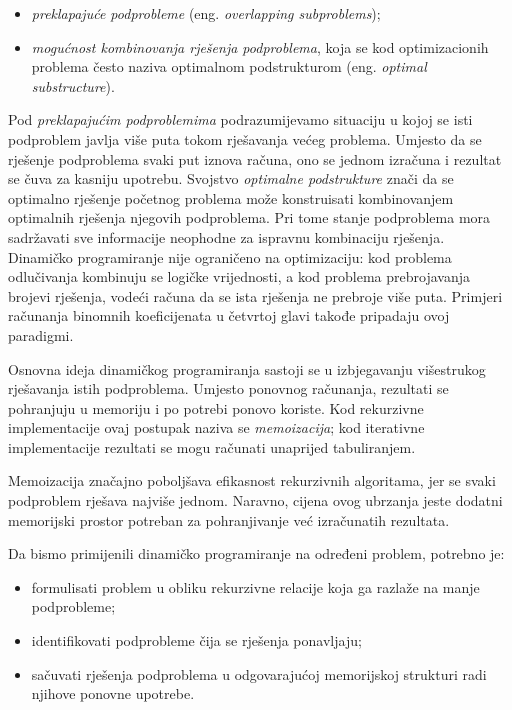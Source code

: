 \begin{itemize}
	\item \textit{preklapajuće podprobleme} (eng. \emph{overlapping subproblems});
	\item \textit{mogućnost kombinovanja rješenja podproblema}, koja se kod optimizacionih problema često naziva optimalnom podstrukturom (eng. \emph{optimal substructure}).
\end{itemize}

Pod \textit{preklapajućim podproblemima} podrazumijevamo situaciju u kojoj se isti podproblem javlja više puta tokom rješavanja većeg problema. Umjesto da se rješenje podproblema svaki put iznova računa, ono se  jednom izračuna i rezultat se čuva za kasniju upotrebu. Svojstvo \textit{optimalne podstrukture} znači da se optimalno rješenje početnog problema može konstruisati kombinovanjem optimalnih rješenja njegovih podproblema. Pri tome stanje podproblema mora sadržavati sve informacije neophodne za ispravnu kombinaciju rješenja. Dinamičko programiranje nije ograničeno na optimizaciju: kod problema odlučivanja kombinuju se logičke vrijednosti, a kod problema prebrojavanja brojevi rješenja, vodeći računa da se ista rješenja ne prebroje više puta. Primjeri računanja binomnih koeficijenata u četvrtoj glavi takođe pripadaju ovoj paradigmi.

Osnovna ideja dinamičkog programiranja sastoji se u izbjegavanju više\-strukog rješavanja istih podproblema. Umjesto ponovnog računanja, rezultati se pohranjuju u memoriju i po potrebi ponovo koriste. Kod rekurzivne implementacije ovaj postupak naziva se \textit{memoizacija}; kod iterativne implementacije rezultati se mogu računati unaprijed tabuliranjem.

Memoizacija značajno poboljšava efikasnost rekurzivnih algoritama, jer se svaki podproblem rješava najviše jednom. Naravno, cijena ovog ubrzanja jeste dodatni memorijski prostor potreban za pohranjivanje već izračunatih rezultata.

\medskip

Da bismo primijenili dinamičko programiranje na određeni problem, potrebno je:

\begin{itemize}
	\item formulisati problem u obliku rekurzivne relacije koja ga razlaže na manje podprobleme;
	\item identifikovati podprobleme čija se rješenja ponavljaju;
	\item sačuvati rješenja podproblema u odgovarajućoj memorijskoj strukturi radi njihove ponovne upotrebe.
\end{itemize}

